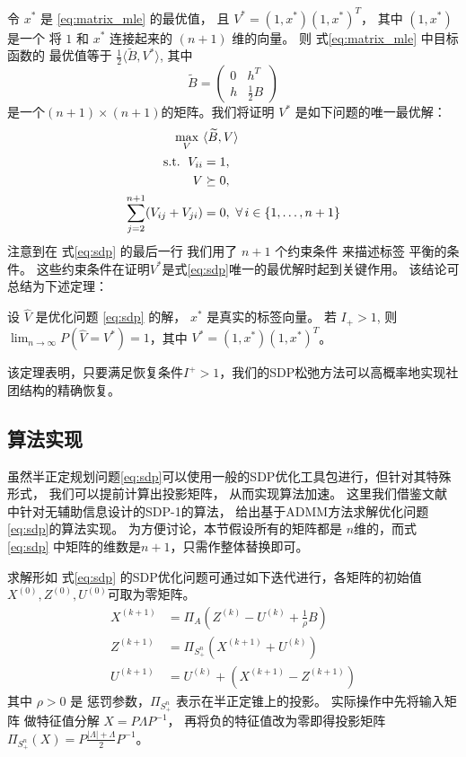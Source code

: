 令 $x^*$ 是 \eqref{eq:matrix_mle} 的最优值，
且 $V^*=(1,x^*)(1,x^*)^T$， 
其中 $(1,x^*)$ 是一个
将 $1$ 和 $x^*$ 连接起来的
$(n+1)$ 维的向量。
	则 式\eqref{eq:matrix_mle} 中目标函数的
    最优值等于 $\frac{1}{2} \langle \widetilde{B}, V^* \rangle$, 其中
	\begin{equation}\label{eq:B_lambda_def}
		\widetilde{B} = \begin{pmatrix} 0 & h^T  \\ h  & \frac{1}{2}B \end{pmatrix} 
	\end{equation}
	是一个$(n+1)\times(n+1)$的矩阵。我们将证明 $V^*$ 是如下问题的唯一最优解：
	\begin{align}
		\max_V\ & \langle \widetilde{B}, V \rangle  \notag\\
		\textrm{ s.t. }\, V_{ii} &= 1, \notag\\
		V &\succeq 0, \notag\\
\sum_{j=2}^{n+1} (V_{ij} + V_{ji})& = 0,~\forall\, i\in\{1,\ldots,n+1\} 
\label{eq:sdp}
	\end{align}
	注意到在 式\eqref{eq:sdp} 的最后一行
    我们用了 $n+1$ 个约束条件 来描述标签 平衡的条件。
    这些约束条件在证明$V^*$是式\eqref{eq:sdp}唯一的最优解时起到关键作用。
    该结论可总结为下述定理：

	\begin{theorem}\label{thm:sdp}
        设 $\hat{V}$ 是优化问题 \eqref{eq:sdp} 的解，
        $x^*$ 是真实的标签向量。
		若 $I_+ > 1$, 则
        $\lim_{n\to\infty} P(\hat{V}=V^*)=1$，其中
		$V^*=(1,x^*)(1,x^*)^T$。
	\end{theorem}
    该定理表明，只要满足恢复条件$I^+>1$，我们的SDP松弛方法可以高概率地实现社团结构的精确恢复。


\subsection{算法实现}\label{sec:sdp_admm}
虽然半正定规划问题\eqref{eq:sdp}可以使用一般的SDP优化工具包进行，但针对其特殊形式，
我们可以提前计算出投影矩阵，
从而实现算法加速。
这里我们借鉴文献  中针对无辅助信息设计的SDP-1的算法，
给出基于ADMM方法求解优化问题\eqref{eq:sdp}的算法实现。
为方便讨论，本节假设所有的矩阵都是 $n$维的，而式 \eqref{eq:sdp} 中矩阵的维数是$n+1$，只需作整体替换即可。

求解形如 式\eqref{eq:sdp} 的SDP优化问题可通过如下迭代进行，各矩阵的初始值$X^{(0)},Z^{(0)},U^{(0)}$可取为零矩阵。
\begin{align}
    X^{(k+1)} &= \Pi_A(Z^{(k)} - U^{(k)} + \frac{1}{\rho}B)\label{eq:admm} \\
    Z^{(k+1)} &= \Pi_{S_+^n}(X^{(k+1)} + U^{(k)}) \\
    U^{(k+1)} &= U^{(k)} + (X^{(k+1)} - Z^{(k+1)}) 
    \end{align}
其中 $\rho>0$ 是 惩罚参数，$\Pi_{S_+^n}$ 表示在半正定锥上的投影。
实际操作中先将输入矩阵 做特征值分解 $X=P\Lambda P^{-1}$，
再将负的特征值改为零即得投影矩阵$\Pi_{S_+^n}(X)=P\frac{|\Lambda| + \Lambda}{2}P^{-1}$。


